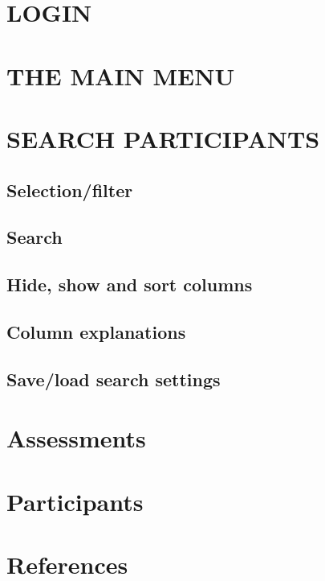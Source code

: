 \documentclass[]{book}
\begin{document}
\hypertarget{login}{%
\chapter{LOGIN}\label{login}}

\hypertarget{the-main-menu}{%
\chapter{THE MAIN MENU}\label{the-main-menu}}

\hypertarget{search-participants}{%
\chapter{SEARCH PARTICIPANTS}\label{search-participants}}

\hypertarget{selectionfilter}{%
\section{Selection/filter}\label{selectionfilter}}

\hypertarget{search}{%
\section{Search}\label{search}}

\hypertarget{hide-show-and-sort-columns}{%
\section{Hide, show and sort columns}\label{hide-show-and-sort-columns}}

\hypertarget{column-explanations}{%
\section{Column explanations}\label{column-explanations}}

\hypertarget{saveload-search-settings}{%
\section{Save/load search settings}\label{saveload-search-settings}}

\hypertarget{assessments}{%
\chapter{Assessments}\label{assessments}}

\hypertarget{participants}{%
\chapter{Participants}\label{participants}}

\hypertarget{references}{%
\chapter{References}\label{references}}


\end{document}
